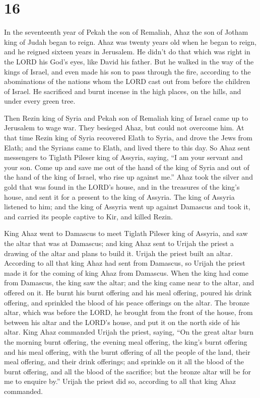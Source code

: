 \hypertarget{section-15}{%
\section{16}\label{section-15}}

 In the seventeenth year of Pekah the son of Remaliah,
Ahaz the son of Jotham king of Judah began to reign.  Ahaz
was twenty years old when he began to reign, and he reigned sixteen
years in Jerusalem. He didn't do that which was right in the LORD his
God's eyes, like David his father.  But he walked in the
way of the kings of Israel, and even made his son to pass through the
fire, according to the abominations of the nations whom the LORD cast
out from before the children of Israel.  He sacrificed and
burnt incense in the high places, on the hills, and under every green
tree.

 Then Rezin king of Syria and Pekah son of Remaliah king
of Israel came up to Jerusalem to wage war. They besieged Ahaz, but
could not overcome him.  At that time Rezin king of Syria
recovered Elath to Syria, and drove the Jews from Elath; and the Syrians
came to Elath, and lived there to this day.  So Ahaz sent
messengers to Tiglath Pileser king of Assyria, saying, ``I am your
servant and your son. Come up and save me out of the hand of the king of
Syria and out of the hand of the king of Israel, who rise up against
me.''  Ahaz took the silver and gold that was found in the
LORD's house, and in the treasures of the king's house, and sent it for
a present to the king of Assyria.  The king of Assyria
listened to him; and the king of Assyria went up against Damascus and
took it, and carried its people captive to Kir, and killed Rezin.

 King Ahaz went to Damascus to meet Tiglath Pileser king
of Assyria, and saw the altar that was at Damascus; and king Ahaz sent
to Urijah the priest a drawing of the altar and plans to build it.
 Urijah the priest built an altar. According to all that
king Ahaz had sent from Damascus, so Urijah the priest made it for the
coming of king Ahaz from Damascus.  When the king had
come from Damascus, the king saw the altar; and the king came near to
the altar, and offered on it.  He burnt his burnt
offering and his meal offering, poured his drink offering, and sprinkled
the blood of his peace offerings on the altar.  The
bronze altar, which was before the LORD, he brought from the front of
the house, from between his altar and the LORD's house, and put it on
the north side of his altar.  King Ahaz commanded Urijah
the priest, saying, ``On the great altar burn the morning burnt
offering, the evening meal offering, the king's burnt offering and his
meal offering, with the burnt offering of all the people of the land,
their meal offering, and their drink offerings; and sprinkle on it all
the blood of the burnt offering, and all the blood of the sacrifice; but
the bronze altar will be for me to enquire by.''  Urijah
the priest did so, according to all that king Ahaz commanded.

